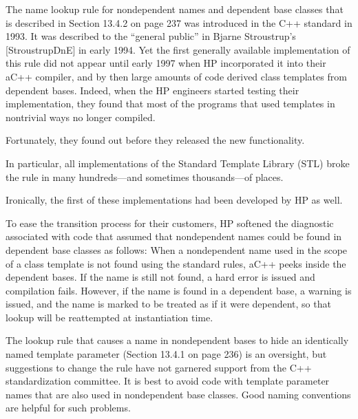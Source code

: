 The name lookup rule for nondependent names and dependent base classes that is described in Section 13.4.2 on page 237 was introduced in the C++ standard in 1993. It was described to the “general public” in Bjarne Stroustrup’s [StroustrupDnE] in early 1994. Yet the first generally available implementation of this rule did not appear until early 1997 when HP incorporated it into their aC++ compiler, and by then large amounts of code derived class templates from dependent bases. Indeed, when the HP engineers started testing their implementation, they found that most of the programs that used templates in nontrivial ways no longer compiled.

\begin{tcolorbox}[colback=webgreen!5!white,colframe=webgreen!75!black]
\hspace*{0.75cm}Fortunately, they found out before they released the new functionality.
\end{tcolorbox}

In particular, all implementations of the Standard Template Library (STL) broke the rule in many hundreds—and sometimes thousands—of places.

\begin{tcolorbox}[colback=webgreen!5!white,colframe=webgreen!75!black]
\hspace*{0.75cm}Ironically, the first of these implementations had been developed by HP as well.
\end{tcolorbox}

To ease the transition process for their customers, HP softened the diagnostic associated with code that assumed that nondependent names could be found in dependent base classes as follows: When a nondependent name used in the scope of a class template is not found using the standard rules, aC++ peeks inside the dependent bases. If the name is still not found, a hard error is issued and compilation fails. However, if the name is found in a dependent base, a warning is issued, and the name is marked to be treated as if it were dependent, so that lookup will be reattempted at instantiation time. 

The lookup rule that causes a name in nondependent bases to hide an identically named template parameter (Section 13.4.1 on page 236) is an oversight, but suggestions to change the rule have not garnered support from the C++ standardization committee. It is best to avoid code with template parameter names that are also used in nondependent base classes. Good naming conventions are helpful for such problems.

